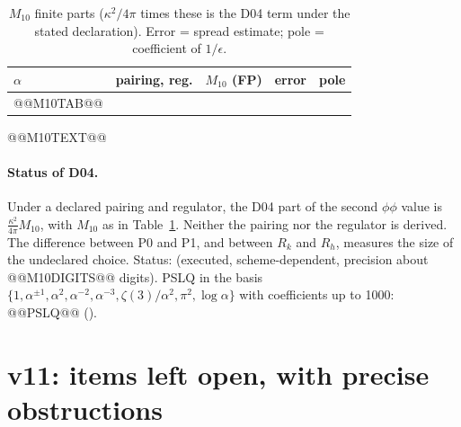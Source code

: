 \begin{center}
\small
\begin{longtable}{@{}lllll@{}}
\caption{\(M_{10}\) finite parts (\(\kappa^2/4\pi\) times these is the D04 term under the stated declaration). Error = spread estimate; pole = coefficient of \(1/\epsilon\).}\label{tab:v11M10}\\
\toprule
\(\alpha\) & pairing, reg. & \(M_{10}\) (FP) & error & pole\\
\midrule
@@M10TAB@@
\bottomrule
\end{longtable}
\end{center}

@@M10TEXT@@

\paragraph{Status of D04.} Under a declared pairing and regulator,
the D04 part of the second \(\phi\phi\) value is
\(\tfrac{\kappa^2}{4\pi}M_{10}\), with \(M_{10}\) as in
Table~\ref{tab:v11M10}. Neither the pairing nor the regulator is
derived. The difference between P0 and P1, and between \(R_k\) and
\(R_h\), measures the size of the undeclared choice. Status:
\PARTIAL{} (executed, scheme-dependent, precision about @@M10DIGITS@@
digits). PSLQ in the basis
\(\{1,\alpha^{\pm1},\alpha^2,\alpha^{-2},\alpha^{-3},\zeta(3)/\alpha^2,\pi^2,\log\alpha\}\)
with coefficients up to 1000: @@PSLQ@@
().

\section{v11: items left open, with precise obstructions}
\label{sec:v11open}

